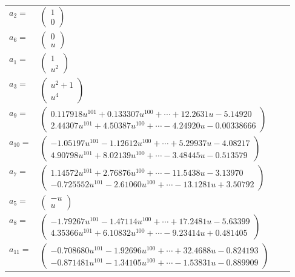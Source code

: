 \documentclass[1p]{elsarticle_modified}
\theoremstyle{definition}
\begin{document}
\begin{tabular}{m{7pt} m{180pt} m{7pt} m{180pt} }
\flushright $a_{2}=$&$\begin{pmatrix}1\\0\end{pmatrix}$ \\
\flushright $a_{6}=$&$\begin{pmatrix}0\\u\end{pmatrix}$ \\
\flushright $a_{1}=$&$\begin{pmatrix}1\\u^2\end{pmatrix}$ \\
\flushright $a_{3}=$&$\begin{pmatrix}u^2+1\\u^4\end{pmatrix}$ \\
\flushright $a_{9}=$&$\begin{pmatrix}0.117918 u^{101}+0.133307 u^{100}+\cdots+12.2631 u-5.14920\\2.44307 u^{101}+4.50387 u^{100}+\cdots-4.24920 u-0.00338666\end{pmatrix}$ \\
\flushright $a_{10}=$&$\begin{pmatrix}-1.05197 u^{101}-1.12612 u^{100}+\cdots+5.29937 u-4.08217\\4.90798 u^{101}+8.02139 u^{100}+\cdots-3.48445 u-0.513579\end{pmatrix}$ \\
\flushright $a_{7}=$&$\begin{pmatrix}1.14572 u^{101}+2.76876 u^{100}+\cdots-11.5438 u-3.13970\\-0.725552 u^{101}-2.61060 u^{100}+\cdots-13.1281 u+3.50792\end{pmatrix}$ \\
\flushright $a_{5}=$&$\begin{pmatrix}- u\\u\end{pmatrix}$ \\
\flushright $a_{8}=$&$\begin{pmatrix}-1.79267 u^{101}-1.47114 u^{100}+\cdots+17.2481 u-5.63399\\4.35366 u^{101}+6.10832 u^{100}+\cdots-9.23414 u+0.481405\end{pmatrix}$ \\
\flushright $a_{11}=$&$\begin{pmatrix}-0.708680 u^{101}-1.92696 u^{100}+\cdots+32.4688 u-0.824193\\-0.871481 u^{101}-1.34105 u^{100}+\cdots-1.53831 u-0.889909\end{pmatrix}$ \\

\end{tabular}
\end{document}
